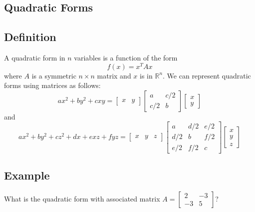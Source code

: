 \subsection*{Quadratic Forms}

\subsection*{Definition}
A quadratic form in $n$ variables is a function of the form
\[f(x)=x^TAx\]
where $A$ is a symmetric $n\times n$ matrix and $x$ is in $\mathbb{R}^n$.
We can represent quadratic forms using matrices as follows:
\[ax^2+by^2+cxy=\begin{bmatrix}
        x & y
    \end{bmatrix}\begin{bmatrix}
        a   & c/2 \\
        c/2 & b
    \end{bmatrix}\begin{bmatrix}
        x \\ y
    \end{bmatrix}\]
and
\[ax^2+by^2+cz^2+dx+exz+fyz=\begin{bmatrix}
        x & y & z
    \end{bmatrix}\begin{bmatrix}
        a   & d/2 & e/2 \\
        d/2 & b   & f/2 \\
        e/2 & f/2 & c
    \end{bmatrix}\begin{bmatrix}
        x \\ y \\ z
    \end{bmatrix}\]

\subsection*{Example}
What is the quadratic form with associated matrix
$A=\begin{bmatrix}
        2  & -3 \\
        -3 & 5
    \end{bmatrix}$?

